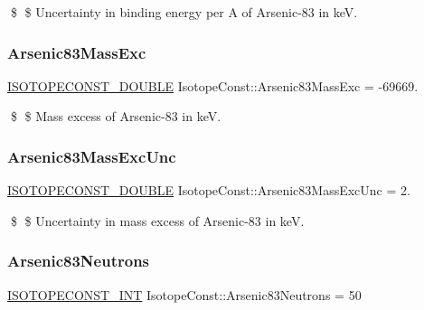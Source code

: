 \$ \$ Uncertainty in binding energy per A of Arsenic-\/83 in keV. \mbox{\label{group___isotope_const-_arsenic-_as83_ga759e644732323df09fd9905223ea0dc4}} 
\subsubsection{\texorpdfstring{Arsenic83\+Mass\+Exc}{Arsenic83MassExc}}
{\footnotesize\ttfamily \mbox{\hyperlink{group___isotope_const-_macros_ga8f45a7272ce02c0b4c65c44636ed719a}{I\+S\+O\+T\+O\+P\+E\+C\+O\+N\+S\+T\+\_\+\+D\+O\+U\+B\+LE}} Isotope\+Const\+::\+Arsenic83\+Mass\+Exc = -\/69669.}

\$ \$ Mass excess of Arsenic-\/83 in keV. \mbox{\label{group___isotope_const-_arsenic-_as83_gaabfb95137b04d7c136651d24043c8226}} 
\subsubsection{\texorpdfstring{Arsenic83\+Mass\+Exc\+Unc}{Arsenic83MassExcUnc}}
{\footnotesize\ttfamily \mbox{\hyperlink{group___isotope_const-_macros_ga8f45a7272ce02c0b4c65c44636ed719a}{I\+S\+O\+T\+O\+P\+E\+C\+O\+N\+S\+T\+\_\+\+D\+O\+U\+B\+LE}} Isotope\+Const\+::\+Arsenic83\+Mass\+Exc\+Unc = 2.}

\$ \$ Uncertainty in mass excess of Arsenic-\/83 in keV. \mbox{\label{group___isotope_const-_arsenic-_as83_gaa0b0c25dc9e67545fedffd524d86406e}} 
\subsubsection{\texorpdfstring{Arsenic83\+Neutrons}{Arsenic83Neutrons}}
{\footnotesize\ttfamily \mbox{\hyperlink{group___isotope_const-_macros_ga5f18360b3e99483a35c32d789e62621c}{I\+S\+O\+T\+O\+P\+E\+C\+O\+N\+S\+T\+\_\+\+I\+NT}} Isotope\+Const\+::\+Arsenic83\+Neutrons = 50}

